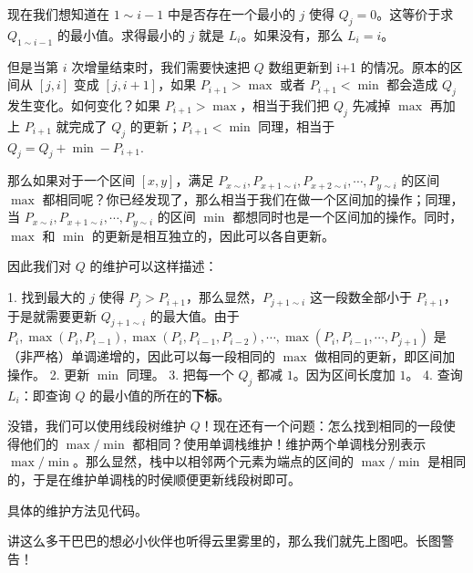 \documentclass[12pt]{ctexart}
\begin{document}
现在我们想知道在 $1\sim i-1$ 中是否存在一个最小的 $j$ 使得 $Q_j=0$。这等价于求 $Q_{1\sim i-1}$ 的最小值。求得最小的 $j$ 就是 $L_i$。如果没有，那么 $L_i=i$。

但是当第 $i$ 次增量结束时，我们需要快速把 $Q$ 数组更新到 i+1 的情况。原本的区间从 $[j,i]$ 变成 $[j,i+1]$，如果 $P_{i+1}>\max$ 或者 $P_{i+1}<\min$ 都会造成 $Q_j$ 发生变化。如何变化？如果 $P_{i+1}>\max$，相当于我们把 $Q_j$ 先减掉 $\max$ 再加上 $P_{i+1}$ 就完成了 $Q_j$ 的更新；$P_{i+1}<\min$ 同理，相当于 $Q_j=Q_j+\min-P_{i+1}$.

那么如果对于一个区间 $[x,y]$，满足 $P_{x\sim i},P_{x+1\sim i},P_{x+2\sim i},\cdots,P_{y\sim i}$ 的区间 $\max$ 都相同呢？你已经发现了，那么相当于我们在做一个区间加的操作；同理，当 $P_{x\sim i},P_{x+1\sim i},\cdots,P_{y\sim i}$ 的区间 $\min$ 都想同时也是一个区间加的操作。同时，$\max$ 和 $\min$ 的更新是相互独立的，因此可以各自更新。

因此我们对 $Q$ 的维护可以这样描述：

1. 找到最大的 $j$ 使得 $P_{j}>P_{i+1}$，那么显然，$P_{j+1\sim i}$ 这一段数全部小于 $P_{i+1}$，于是就需要更新 $Q_{j+1\sim i}$ 的最大值。由于 $P_{i},\max(P_i,P_{i-1}),\max(P_i,P_{i-1},P_{i-2}),\cdots,\max(P_i,P_{i-1},\cdots,P_{j+1})$ 是（非严格）单调递增的，因此可以每一段相同的 $\max$ 做相同的更新，即区间加操作。
2. 更新 $\min$ 同理。
3. 把每一个 $Q_j$ 都减 $1$。因为区间长度加 $1$。
4. 查询 $L_i$：即查询 $Q$ 的最小值的所在的\textbf{下标}。

没错，我们可以使用线段树维护 $Q$！现在还有一个问题：怎么找到相同的一段使得他们的 $\max/\min$ 都相同？使用单调栈维护！维护两个单调栈分别表示 $\max/\min$。那么显然，栈中以相邻两个元素为端点的区间的 $\max/\min$ 是相同的，于是在维护单调栈的时侯顺便更新线段树即可。

具体的维护方法见代码。

讲这么多干巴巴的想必小伙伴也听得云里雾里的，那么我们就先上图吧。长图警告！
\end{document}
